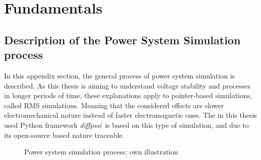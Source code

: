 
\label{app:appendix}


%  
%
%





\chapter{Fundamentals}

\section{Description of the Power System Simulation process}
\label{app:power-system-modeling}

In this appendix section, the general process of power system simulation is described. As this thesis is aiming to understand voltage stability and processes in longer periods of time, these explanations apply to pointer-based simulations, called RMS simulations. Meaning that the considered effects are slower electromechanical nature instead of faster electromagnetic ones. The in this thesis used Python framework \glqq \textit{diffpssi}\grqq~is based on this type of simulation, and due to its open-source based nature traceable.

\begin{figure}[htbp]
    \centering
    \caption{Power system simulation process; own illustration}
    \label{fig:power-system-simulation-process}
\end{figure}

